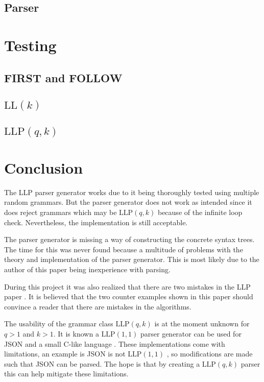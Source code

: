 \documentclass[a4paper,12pt]{article}
\newcommand\LL{\text{LL}}
\newcommand\LLP{\text{LLP}}
\theoremstyle{definition}
\begin{document}
\subsection{Parser}


\section{Testing}
\subsection{FIRST and FOLLOW}


\subsection{\texorpdfstring{$\LL(k)$}{TEXT}}


\subsection{\texorpdfstring{$\LLP(q,k)$}{TEXT}}


\newpage
\section{Conclusion}
The LLP parser generator works due to it being thoroughly tested using multiple random grammars. But the parser generator does not work as intended since it does reject grammars which may be $\LLP(q,k)$ because of the infinite loop check. Nevertheless, the implementation is still acceptable.

The parser generator is missing a way of constructing the concrete syntax trees. The time for this was never found because a multitude of problems with the theory and implementation of the parser generator. This is most likely due to the author of this paper being inexperience with parsing.

During this project it was also realized that there are two mistakes in the LLP paper \cite{Vagner2007}. It is believed that the two counter examples shown in this paper should convince a reader that there are mistakes in the algorithms.

The usability of the grammar class $\LLP(q, k)$ is at the moment unknown for $q > 1$ and $k > 1$. It is known a $\LLP(1, 1)$ parser generator can be used for JSON and a small C-like language \cite{voetter2021}. These implementations come with limitations, an example is JSON is not $\LLP(1, 1)$ \cite[60]{voetter2021}, so modifications are made such that JSON can be parsed. The hope is that by creating a $\LLP(q, k)$ parser this can help mitigate these limitations.

\printbibliography
\end{document}
